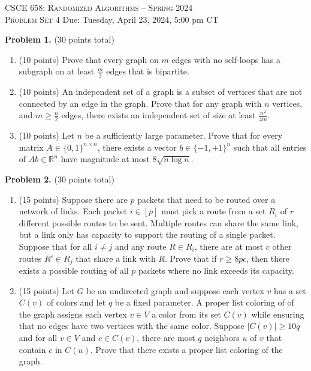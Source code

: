 \documentclass[11pt]{article}
\begin{document}
\begin{center}
{\Large\textsc{CSCE 658: Randomized Algorithms -- Spring 2024 \\ 
Problem Set 4}}
\vskip 0.1in
Due: Tuesday, April 23, 2024, 5:00 pm CT
\end{center}

\noindent
\textbf{Problem 1.} (30 points total)
\begin{enumerate}
\item (10 points)
Prove that every graph on $m$ edges with no self-loops has a subgraph on at least $\frac{m}{2}$ edges that is bipartite.
\item (10 points)
An independent set of a graph is a subset of vertices that are not connected by an edge in the graph. 
Prove that for any graph with $n$ vertices, and $m\ge\frac{n}{2}$ edges, there exists an independent set of
size at least $\frac{n^2}{4m}$. 
\item (10 points)
Let $n$ be a sufficiently large parameter. 
Prove that for every matrix $A\in\{0,1\}^{n\times n}$, there exists a vector $b\in\{-1,+1\}^n$ such that all entries of $Ab\in\mathbb{R}^n$ have magnitude at most $8\sqrt{n\log n}$. 
\end{enumerate}

\vskip 0.2in\noindent
\textbf{Problem 2.} (30 points total)
\begin{enumerate}
\item (15 points)
Suppose there are $p$ packets that need to be routed over a network of links. 
Each packet $i\in[p]$ must pick a route from a set $R_i$ of $r$ different possible routes to be sent. 
Multiple routes can share the same link, but a link only has capacity to support the routing of a single packet. 
Suppose that for all $i\neq j$ and any route $R\in R_i$, there are at most $c$ other routes $R'\in R_j$ that share a link with $R$. 
Prove that if $r\ge 8pc$, then there exists a possible routing of all $p$ packets where no link exceeds its capacity.
\item (15 points)
Let $G$ be an undirected graph and suppose each vertex $v$ has a set $C(v)$ of colors and let $q$ be a fixed parameter.  
A proper list coloring of of the graph assigns each vertex $v\in V$ a color from its set $C(v)$ while ensuring that no edges have two vertices with the same color. 
Suppose $|C(v)|\ge 10q$ and for all $v\in V$ and $c\in C(v)$, there are most $q$ neighbors $u$ of $v$ that contain $c$ in $C(u)$. 
Prove that there exists a proper list coloring of the graph. 
\end{enumerate}
\end{document}
